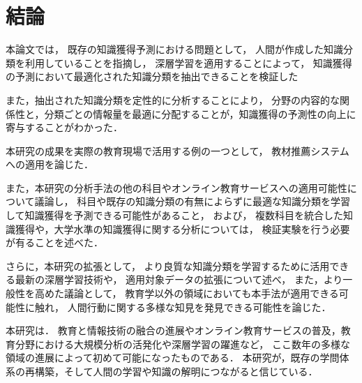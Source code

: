 \chapter{結論}
\label{chap:conlusion}
\fancyhf{}
\rhead{\thepage}
\cfoot{\thepage}


本論文では，
既存の知識獲得予測における問題として，
人間が作成した知識分類を利用していることを指摘し，
深層学習を適用することによって，
知識獲得の予測において最適化された知識分類を抽出できることを検証した

また，抽出された知識分類を定性的に分析することにより，
分野の内容的な関係性と，分類ごとの情報量を最適に分配することが，知識獲得の予測性の向上に寄与することがわかった．
\vvspace

本研究の成果を実際の教育現場で活用する例の一つとして，
教材推薦システムへの適用を論じた．

また，本研究の分析手法の他の科目やオンライン教育サービスへの適用可能性について議論し，
科目や既存の知識分類の有無によらずに最適な知識分類を学習して知識獲得を予測できる可能性があること，
および，
複数科目を統合した知識獲得や，大学水準の知識獲得に関する分析については，
検証実験を行う必要が有ることを述べた．
\vvspace


さらに，本研究の拡張として，
より良質な知識分類を学習するために活用できる最新の深層学習技術や，
適用対象データの拡張について述べ，
また，より一般性を高めた議論として，
教育学以外の領域においても本手法が適用できる可能性に触れ，
人間行動に関する多様な知見を発見できる可能性を論じた．
\vvspace

本研究は．
教育と情報技術の融合の進展やオンライン教育サービスの普及，教育分野における大規模分析の活発化や深層学習の躍進など，
ここ数年の多様な領域の進展によって初めて可能になったものである．
本研究が，既存の学問体系の再構築，そして人間の学習や知識の解明につながると信じている．
